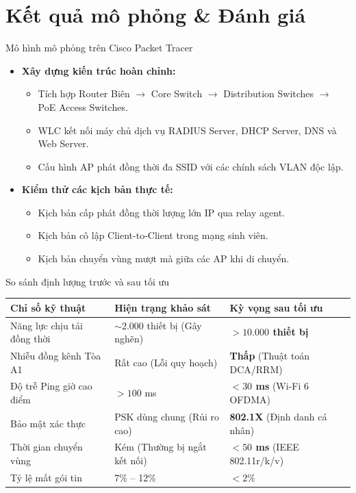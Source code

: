 \documentclass[fleqn]{beamer}
\begin{document}
\section{Kết quả mô phỏng \& Đánh giá}

\begin{frame}{Mô hình mô phỏng trên Cisco Packet Tracer}
  \begin{itemize}
    \item \textbf{Xây dựng kiến trúc hoàn chỉnh:}
      \begin{itemize}\small
        \item Tích hợp Router Biên $\rightarrow$ Core Switch $\rightarrow$ Distribution Switches $\rightarrow$ PoE Access Switches.
        \item WLC kết nối máy chủ dịch vụ RADIUS Server, DHCP Server, DNS và Web Server.
        \item Cấu hình AP phát đồng thời đa SSID với các chính sách VLAN độc lập.
      \end{itemize}
    \item \textbf{Kiểm thử các kịch bản thực tế:}
      \begin{itemize}\small
        \item Kịch bản cấp phát đồng thời lượng lớn IP qua relay agent.
        \item Kịch bản cô lập Client-to-Client trong mạng sinh viên.
        \item Kịch bản chuyển vùng mượt mà giữa các AP khi di chuyển.
      \end{itemize}
  \end{itemize}
\end{frame}

\begin{frame}{So sánh định lượng trước và sau tối ưu}
  \begin{table}\small\centering
  \begin{tabular}{lll}
    \toprule
    \textbf{Chỉ số kỹ thuật} & \textbf{Hiện trạng khảo sát} & \textbf{Kỳ vọng sau tối ưu} \\
    \midrule
    Năng lực chịu tải đồng thời & $\sim 2.000$ thiết bị (Gây nghẽn) & \textbf{$> 10.000$ thiết bị} \\
    Nhiễu đồng kênh Tòa A1 & Rất cao (Lỗi quy hoạch) & \textbf{Thấp} (Thuật toán DCA/RRM) \\
    Độ trễ Ping giờ cao điểm & $> 100$ ms & \textbf{$< 30$ ms} (Wi-Fi 6 OFDMA) \\
    Bảo mật xác thực & PSK dùng chung (Rủi ro cao) & \textbf{802.1X} (Định danh cá nhân) \\
    Thời gian chuyển vùng & Kém (Thường bị ngắt kết nối) & \textbf{$< 50$ ms} (IEEE 802.11r/k/v) \\
    Tỷ lệ mất gói tin & 7\% -- 12\% & \textbf{$< 2\%$} \\
    \bottomrule
  \end{tabular}
  \end{table}
\end{frame}
\end{document}

